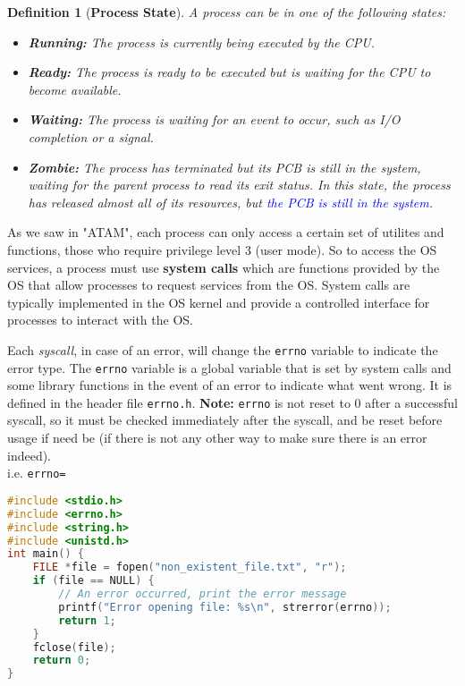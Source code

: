 \documentclass[openany,12pt]{book}
\newtheorem*{definition}{Definition}
\begin{document}
\begin{definition}
    [\textbf{Process State}]
    A process can be in one of the following states:
    \begin{itemize}
        \item \textbf{Running:} The process is currently being executed by the CPU.
        \item \textbf{Ready:} The process is ready to be executed but is waiting for the CPU to become available.
        \item \textbf{Waiting:} The process is waiting for an event to occur, such as I/O completion or a signal.
        \item \textbf{Zombie:} The process has terminated but its PCB is still in the system, waiting for the parent process to read its exit status. In this state, the process has released almost all of its resources, but \textcolor{blue}{the PCB is still in the system}.
    \end{itemize}
\end{definition}


As we saw in "ATAM", each process can only access a certain set of utilites and functions, those who require privilege level 3 (user mode). So to access the OS services, a process must use \textbf{system calls} which are functions provided by the OS that allow processes to request services from the OS. System calls are typically implemented in the OS kernel and provide a controlled interface for processes to interact with the OS.

\vspace{1em}

Each \textit{syscall}, in case of an error, will change the \texttt{errno} variable to indicate the error type. The \texttt{errno} variable is a global variable that is set by system calls and some library functions in the event of an error to indicate what went wrong. It is defined in the header file \texttt{errno.h}. {\color{blue}\textbf{Note:} \texttt{errno} is not reset to 0 after a successful syscall, so it must be checked immediately after the syscall, and be reset before usage if need be} (if there is not any other way to make sure there is an error indeed).\\
i.e. \texttt{errno=}


\begin{lstlisting}[language=C++, caption={Example of using \texttt{errno} in C}, label={lst:errno_example}]
#include <stdio.h>
#include <errno.h>
#include <string.h>
#include <unistd.h>
int main() {
    FILE *file = fopen("non_existent_file.txt", "r");
    if (file == NULL) {
        // An error occurred, print the error message
        printf("Error opening file: %s\n", strerror(errno));
        return 1;
    }
    fclose(file);
    return 0;
}
\end{lstlisting}
\end{document}
